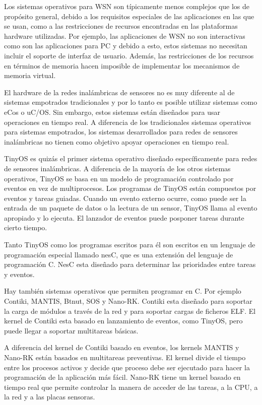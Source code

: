 Los sistemas operativos para WSN son típicamente menos complejos que los de propósito general, debido a los requisitos especiales de las aplicaciones en las que se usan, como a las restricciones de recursos encontradas en las plataformas hardware utilizadas. Por ejemplo, las aplicaciones de WSN no son interactivas como son las aplicaciones para PC y debido a esto, estos sistemas no necesitan incluir el soporte de interfaz de usuario. Además, las restricciones de los recursos en términos de memoria hacen imposible de implementar los mecanismos de memoria virtual.



El hardware de la redes inalámbricas de sensores no es muy diferente al de sistemas empotrados tradicionales y por lo tanto es posible utilizar sistemas como eCos o uC/OS. Sin embargo, estos sistemas están diseñados para usar operaciones en tiempo real. A diferencia de los tradicionales sistemas operativos para sistemas empotrados, los sistemas desarrollados para redes de sensores inalámbricas no tienen como objetivo apoyar operaciones en tiempo real.



TinyOS es quizás el primer sistema operativo diseñado específicamente para redes de sensores inalámbricas. A diferencia de la mayoría de los otros sistemas operativos, TinyOS se basa en un modelo de programación controlado por eventos en vez de multiprocesos. Los programas de TinyOS están compuestos por eventos y tareas guiadas. Cuando un evento externo ocurre, como puede ser la entrada de un paquete de datos o la lectura de un sensor, TinyOS llama al evento apropiado y lo ejecuta. El lanzador de eventos puede posponer tareas durante cierto tiempo. 



Tanto TinyOS como los programas escritos para él son escritos en un lenguaje de programación especial llamado nesC, que es una extensión del lenguaje de programación C. NesC esta diseñado para determinar las prioridades entre tareas y eventos.



Hay también sistemas operativos que permiten programar en C. Por ejemplo Contiki, MANTIS, Btnut, SOS y Nano-RK. Contiki esta diseñado para soportar la carga de módulos a través de la red y para soportar cargas de ficheros ELF. El kernel de Contiki esta basado en lanzamiento de eventos, como TinyOS, pero puede llegar a soportar multitareas básicas. 



A diferencia del kernel de Contiki basado en eventos, los kernels MANTIS y Nano-RK están basados en multitareas preventivas. El kernel divide el tiempo entre los procesos activos y decide que proceso debe ser ejecutado para hacer la programación de la aplicación más fácil. Nano-RK tiene un kernel basado en tiempo real que permite controlar la manera de acceder de las tareas, a la CPU, a la red y a las placas sensoras. 




